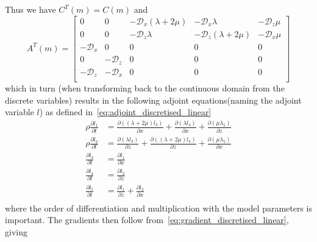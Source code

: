 \documentclass[10pt]{SelfArx} %
\newcommand{\pder}[2][]{\frac{\partial#1}{\partial#2}}
\theoremstyle{definition}
\begin{document}
Thus we have $C^T\left(m\right) = C\left(m\right)$ and 
\begin{equation}
A^T\left(m\right) = 
\begin{bmatrix}
0 & 0 & -\mathcal{D}_x\left(\lambda + 2\mu\right) & -\mathcal{D}_x\lambda & -\mathcal{D}_z\mu \\
0 & 0 & -\mathcal{D}_z \lambda & -\mathcal{D}_z\left(\lambda + 2\mu\right) & -\mathcal{D}_x\mu \\
-\mathcal{D}_x & 0 & 0 & 0 & 0 \\
0 & -\mathcal{D}_z & 0 & 0 & 0 \\
-\mathcal{D}_z & -\mathcal{D}_x & 0 & 0 & 0 \\
\end{bmatrix}
\end{equation}
which in turn (when transforming back to the continuous domain from the discrete variables) results in the following adjoint equations(naming the adjoint variable $l$) as defined in~\cref{eq:adjoint_discretised_linear}
\begin{equation}\label{eq:elastic_adjoint}
\begin{aligned}
\rho \pder[l_1]{t} &= \pder[\left(\left(\lambda + 2\mu\right)l_3\right)]{x} + \pder[\left(\lambda l_4\right)]{x} + \pder[\left(\mu \lambda_5\right)]{z} \\
\rho \pder[l_2]{t} &= \pder[\left(\lambda l_3\right)]{z} + \pder[\left(\left(\lambda + 2\mu\right)l_4\right)]{z} + \pder[\left(\mu \lambda_5\right)]{x} \\
\pder[l_3]{t} &= \pder[l_1]{x}\\
\pder[l_4]{t} &= \pder[l_2]{z}\\
\pder[l_5]{t} &= \pder[l_1]{z} + \pder[l_2]{x}\\
\end{aligned}
\end{equation}
where the order of differentiation and multiplication with the model parameters is important. 
The gradients then follow from~\cref{eq:gradient_discretised_linear}, giving 
\end{document}
